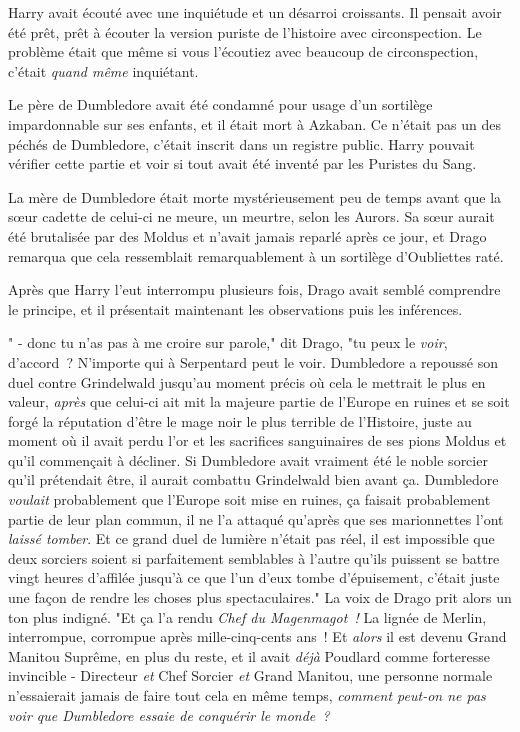 \later

Harry avait écouté avec une inquiétude et un désarroi croissants. Il pensait avoir été prêt, prêt à écouter la version puriste de l'histoire avec circonspection. Le problème était que même si vous l'écoutiez avec beaucoup de circonspection, c'était \emph{quand même} inquiétant.

Le père de Dumbledore avait été condamné pour usage d'un sortilège impardonnable sur ses enfants, et il était mort à Azkaban. Ce n'était pas un des péchés de Dumbledore, c'était inscrit dans un registre public. Harry pouvait vérifier cette partie et voir si tout avait été inventé par les Puristes du Sang.

La mère de Dumbledore était morte mystérieusement peu de temps avant que la sœur cadette de celui-ci ne meure, un meurtre, selon les Aurors. Sa sœur aurait été brutalisée par des Moldus et n'avait jamais reparlé après ce jour, et Drago remarqua que cela ressemblait remarquablement à un sortilège d'Oubliettes raté.

Après que Harry l'eut interrompu plusieurs fois, Drago avait semblé comprendre le principe, et il présentait maintenant les observations puis les inférences.

" - donc tu n'as pas à me croire sur parole," dit Drago, "tu peux le \emph{voir}, d'accord~? N'importe qui à Serpentard peut le voir. Dumbledore a repoussé son duel contre Grindelwald jusqu'au moment précis où cela le mettrait le plus en valeur, \emph{après} que celui-ci ait mit la majeure partie de l'Europe en ruines et se soit forgé la réputation d'être le mage noir le plus terrible de l'Histoire, juste au moment où il avait perdu l'or et les sacrifices sanguinaires de ses pions Moldus et qu'il commençait à décliner. Si Dumbledore avait vraiment été le noble sorcier qu'il prétendait être, il aurait combattu Grindelwald bien avant ça. Dumbledore \emph{voulait} probablement que l'Europe soit mise en ruines, ça faisait probablement partie de leur plan commun, il ne l'a attaqué qu'après que ses marionnettes l'ont \emph{laissé tomber}. Et ce grand duel de lumière n'était pas réel, il est impossible que deux sorciers soient si parfaitement semblables à l'autre qu'ils puissent se battre vingt heures d'affilée jusqu'à ce que l'un d'eux tombe d'épuisement, c'était juste une façon de rendre les choses plus spectaculaires." La voix de Drago prit alors un ton plus indigné. "Et ça l'a rendu \emph{Chef du Magenmagot~!} La lignée de Merlin, interrompue, corrompue après mille-cinq-cents ans~! Et \emph{alors} il est devenu Grand Manitou Suprême, en plus du reste, et il avait \emph{déjà} Poudlard comme forteresse invincible - Directeur \emph{et} Chef Sorcier \emph{et} Grand Manitou, une personne normale n'essaierait jamais de faire tout cela en même temps, \emph{comment peut-on ne pas voir que Dumbledore essaie de conquérir le monde~?}

